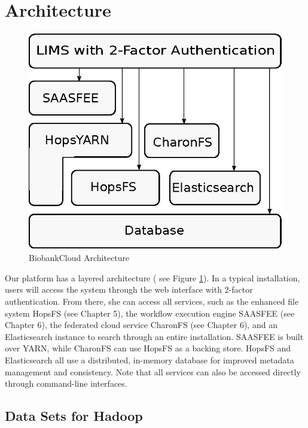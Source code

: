 \section{Architecture}

 \begin{figure}[h]
 \centering
 \includegraphics[scale=0.75]{./imgs/stack.eps}
 \caption{BiobankCloud Architecture}
 \label{fig:arch}
\end{figure}

Our platform has a layered architecture ( see Figure \ref{fig:arch}). In a typical installation, users will access the system through the web interface with 2-factor authentication. From there, she can access all services, such as the enhanced file system HopsFS (see Chapter 5), the workflow execution engine SAASFEE (see Chapter 6), the federated cloud service CharonFS (see Chapter 6), and an Elasticsearch instance to search through an entire installation. SAASFEE is built over YARN, while CharonFS can use HopsFS as a backing store. HopsFS and  Elasticsearch all use a distributed, in-memory database for improved metadata management and consistency. Note that all services can also be accessed directly through command-line interfaces.

\subsection*{Data Sets for Hadoop}

